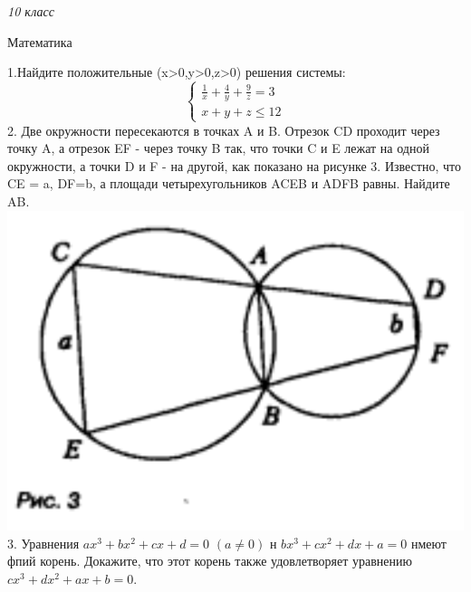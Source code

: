 \begin{multicols*}{3}
\indent \small \textit{10 класс}

\indent \small Математика

\indent \small 1.Найдите положительные (x>0,y>0,z>0) решения системы:
$$
\left\{\begin{array}{l}
\frac{1}{x}+\frac{4}{y}+\frac{9}{z}=3 \\
x+y+z \leq 12
\end{array}\right.
$$
\indent \small 2. Две окружности пересекаются в точках A и B. Отрезок CD проходит через точку A, а отрезок EF - через точку B так, что точки C и E лежат на одной окружности, а точки D и F - на другой, как показано на рисунке 3. Известно, что CE = a, DF=b, а площади четырехугольников ACEB и ADFB равны. Найдите AB.
\includegraphics[scale=0.3]{images/image3.png}
\indent \small 3. Уравнения $a x^3+b x^2+c x+d=0$ $(a \neq 0)$ н $b x^3+c x^2+d x+a=0$ нмеют фпий корень. Докажите, что этот корень также удовлетворяет уравнению $c x^3+d x^2+a x+b=0$.


\end{multicols*}

